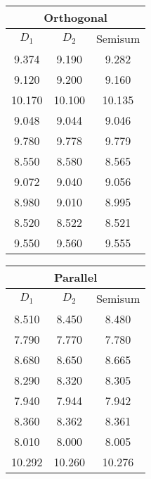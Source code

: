 \begin{table}[H]
    \centering
        \begin{tabular}{|c|c|c|}
            \hline
            \multicolumn{3}{|c|}{\textbf{Orthogonal}} \\
            \hline
            \textbf{$D_1$} & \textbf{$D_2$} & Semisum \\
            \hline
            9.374 & 9.190 & 9.282 \\
            \hline
            9.120 & 9.200 & 9.160 \\
            \hline
            10.170 & 10.100 & 10.135 \\
            \hline
             9.048 & 9.044 & 9.046 \\
            \hline
            9.780 & 9.778 & 9.779 \\
            \hline
            8.550 & 8.580 & 8.565 \\
            \hline
             9.072 & 9.040 & 9.056 \\
            \hline
            8.980 & 9.010 & 8.995 \\
            \hline
            8.520 & 8.522 & 8.521 \\
            \hline
            9.550 & 9.560 & 9.555 \\
            \hline
        \end{tabular}
        \vspace{1cm}
        \begin{tabular}{|c|c|c|}
            \hline
            \multicolumn{3}{|c|}{\textbf{Parallel}} \\
            \hline
            \textbf{$D_1$} & \textbf{$D_2$} & Semisum \\
            \hline
            8.510 & 8.450 & 8.480 \\
            \hline
            7.790 & 7.770 & 7.780 \\
            \hline
            8.680 & 8.650 & 8.665 \\
            \hline
             8.290 & 8.320 & 8.305 \\
            \hline
            7.940 & 7.944 & 7.942 \\
            \hline
            8.360 & 8.362 & 8.361 \\
            \hline
             8.010 & 8.000 & 8.005 \\
            \hline
            10.292 & 10.260 & 10.276 \\

\end{tabular}
\end{table}
